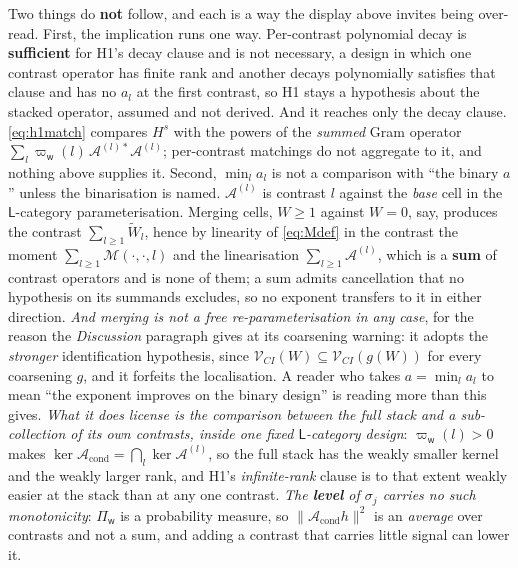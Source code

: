 Two things do \textbf{not} follow, and each is a way the display above invites being over-read.
First, the implication runs one way. Per-contrast polynomial decay is \textbf{sufficient} for
H1's decay clause and is not necessary, a design in which one contrast operator has finite rank and
another decays polynomially satisfies that clause and has no $a_l$ at the first contrast, so H1 stays
a hypothesis about the stacked operator, assumed and not derived. And it reaches only the decay
clause. \eqref{eq:h1match} compares $H^{s}$ with the powers of the \emph{summed} Gram operator
$\sum_l\varpi_{\mathsf w}(l)\,\mathcal A^{(l)\ast}\mathcal A^{(l)}$;
per-contrast matchings do not aggregate to it, and nothing above supplies it. Second,
$\min_la_l$ is not a comparison with ``the binary $a$'' unless the binarisation is named.
$\mathcal A^{(l)}$ is contrast $l$ against the \emph{base} cell in the $\mathsf L$-category
parameterisation. Merging cells, $W\ge1$ against $W=0$, say, produces the contrast
$\sum_{l\ge1}\widetilde W_l$, hence by linearity of \eqref{eq:Mdef} in the contrast the moment
$\sum_{l\ge1}\mathcal M(\cdot,\cdot,l)$ and the linearisation $\sum_{l\ge1}\mathcal A^{(l)}$, which is a
\textbf{sum} of contrast operators and is none of them; a sum admits cancellation that no hypothesis on
its summands excludes, so no exponent transfers to it in either direction. \emph{And merging is not a
free re-parameterisation in any case}, for the reason the \emph{Discussion} paragraph gives at its
coarsening warning: it adopts the \emph{stronger} identification hypothesis, since
$\mathcal V_{CI}(W)\subseteq\mathcal V_{CI}(g(W))$ for every coarsening $g$, and it forfeits the
localisation. A reader who takes $a=\min_la_l$ to
mean ``the exponent improves on the binary design'' is reading more than this gives. \emph{What it does
license is the comparison between the full stack and a sub-collection of its own contrasts, inside one
fixed $\mathsf L$-category design}: $\varpi_{\mathsf w}(l)>0$ makes
$\ker\mathcal A_{\mathrm{cond}}=\bigcap_l\ker\mathcal A^{(l)}$, so the full stack has the weakly smaller
kernel and the weakly larger rank, and H1's \emph{infinite-rank} clause is to that extent weakly easier
at the stack than at any one contrast. \emph{The \textbf{level} of $\sigma_j$ carries no such
monotonicity}: $\Pi_{\mathsf w}$ is a probability measure, so
$\|\mathcal A_{\mathrm{cond}}h\|^{2}$ is an \emph{average} over contrasts and not a sum, and adding a
contrast that carries little signal can lower it.

